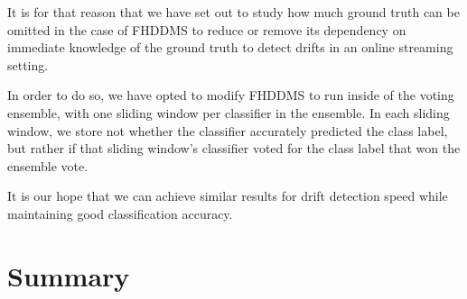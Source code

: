 It is for that reason that we have set out to study how much ground truth can be omitted in the case of FHDDMS to reduce or remove its dependency on immediate knowledge of the ground truth to detect drifts in an online streaming setting.

In order to do so, we have opted to modify FHDDMS to run inside of the voting ensemble, with one sliding window per classifier in the ensemble. In each sliding window, we store not whether the classifier accurately predicted the class label, but rather if that sliding window's classifier voted for the class label that won the ensemble vote.

It is our hope that we can achieve similar results for drift detection speed while maintaining good classification accuracy.


\section{Summary}


